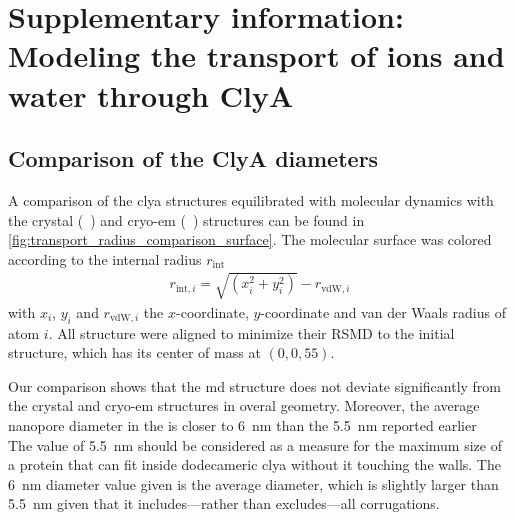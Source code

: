 \chapter[SI: Modeling the transport of ions and water through {ClyA}]%
        {Supplementary information: Modeling the transport of ions and water through {ClyA}}
%
\label{ch:transport_appendix}
%

\begin{shaded}
\newpage
\end{shaded}


\section{Comparison of the {ClyA} \lumen{} diameters}
%
\label{sec:transport_appendix:radius_comparision}
%

A comparison of the \gls{clya} structures equilibrated with molecular dynamics with the crystal
(~\cite{Mueller-2009}) and \gls{cryo-em} (~\cite{Peng-2019}) structures can be found
in \cref{fig:transport_radius_comparison_surface}. The molecular surface was colored according to the internal
radius $r_{\text{int}}$
%
\begin{align}\label{eq:internal_radius}
  r_{\text{int},i} = \sqrt{(x_i^2 + y_i^2)} - r_{\text{vdW},i}
\end{align}
%
with $x_i$, $y_i$ and $r_{\text{vdW},i}$ the $x$-coordinate, $y$-coordinate and van der Waals radius of atom
$i$. All structure were aligned to minimize their RSMD to the initial structure, which has its center of mass
at $(0,0,55)$.

Our comparison shows that the \gls{md} structure does not deviate significantly from the crystal and
\gls{cryo-em} structures in overal geometry. Moreover, the average nanopore diameter in the \cisi{} \lumen{}
is closer to \SI{6}{\nm} than the \SI{5.5}{\nm} reported earlier~\cite{Willems-Ruic-Biesemans-2019} The value
of \SI{5.5}{\nm} should be considered as a measure for the maximum size of a protein that can fit inside
dodecameric \gls{clya} without it touching the walls. The \SI{6}{\nm} diameter value given is the average
\lumen{} diameter, which is slightly larger than \SI{5.5}{\nm} given that it includes---rather than
excludes---all corrugations. 

